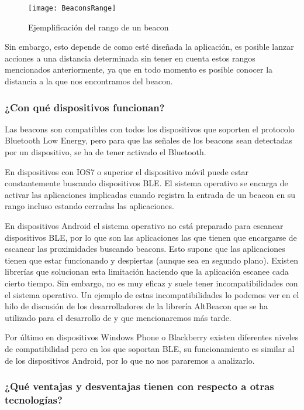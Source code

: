 \begin{figure}[h]
	\centering
	\texttt{[image: BeaconsRange]}
	\caption{Ejemplificación del rango de un beacon}
	\label{fig:beaconRange}
\end{figure}

Sin embargo, esto depende de como esté diseñada la aplicación, es posible lanzar acciones a una distancia determinada sin tener en cuenta estos rangos mencionados anteriormente, ya que en todo momento es posible conocer la distancia a la que nos encontramos del beacon.

\subsubsection{¿Con qué dispositivos funcionan?}

Las beacons son compatibles con todos los dispositivos que soporten el protocolo Bluetooth Low Energy, pero para que las señales de los beacons sean detectadas por un dispositivo, se ha de tener activado el Bluetooth. 


En dispositivos con IOS7 \cite{URL::IOS7} o superior el dispositivo móvil puede estar constantemente buscando dispositivos BLE. El sistema operativo se encarga de activar las aplicaciones implicadas cuando registra la entrada de un beacon en su rango incluso estando cerradas las aplicaciones.


En dispositivos Android \cite{URL::Android} el sistema operativo no está preparado para escanear dispositivos BLE, por lo que son las aplicaciones las que tienen que encargarse de escanear las proximidades buscando beacons. Esto supone que las aplicaciones tienen que estar funcionando y despiertas (aunque sea en segundo plano). Existen librerías que solucionan esta limitación haciendo que la aplicación escanee cada cierto tiempo. Sin embargo, no es muy eficaz y suele tener incompatibilidades con el sistema operativo. Un ejemplo de estas incompatibilidades lo podemos ver en el hilo de discusión \cite{URL::Incompatibilidades} de los desarrolladores de la librería AltBeacon que se ha utilizado para el desarrollo de \BulletPoint{} y que mencionaremos más tarde.

Por último en dispositivos Windows Phone \cite{URL::WindowsPhone} o Blackberry \cite{URL::Blackberry} existen diferentes niveles de compatibilidad pero en los que soportan BLE, su funcionamiento es similar al de los dispositivos Android, por lo que no nos pararemos a analizarlo. 

\subsubsection{¿Qué ventajas y desventajas tienen con respecto a otras tecnologías?}

